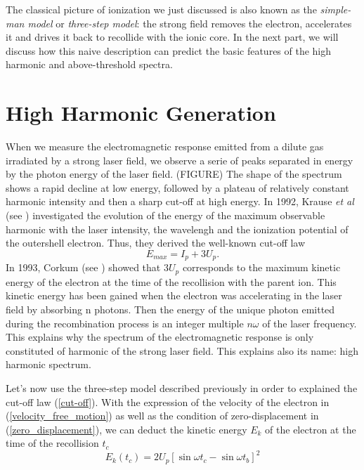 \documentclass[a4paper]{article}
\begin{document}
The classical picture of ionization we just discussed is also known as the \textit{simple-man model} or \textit{three-step model}:
the strong field removes the electron, accelerates it and drives it back to recollide with the ionic core.
In the next part, we will discuss how this naive description can predict the basic features of the high harmonic and above-threshold spectra.

\section{High Harmonic Generation}

When we measure the electromagnetic response emitted from a dilute gas irradiated by a strong laser field, we observe a serie of peaks separated in energy by the photon energy of the laser field. (FIGURE) The shape of the spectrum shows a rapid decline at low energy, followed by a plateau of relatively constant harmonic intensity and then a sharp cut-off at high energy.
In 1992, Krause \textit{et al} (see \cite{Krause_1992}) investigated the evolution of the energy of the maximum observable harmonic with the laser intensity, the wavelengh and the ionization potential of the outershell electron. Thus, they derived the well-known cut-off law
\begin{equation}
\label{cut-off}
E_{max}=I_{p}+3U_{p}.
\end{equation}
In 1993, Corkum (see \cite{Corkum_1993}) showed that $3U_{p}$ corresponds to the maximum kinetic energy of the electron at the time of the recollision with the parent ion. This kinetic energy has been gained when the electron was accelerating in the laser field by absorbing n photons. Then the energy of the unique photon emitted during the recombination process is an integer multiple $n\omega$ of the laser frequency. This explains why the spectrum of the electromagnetic response is only constituted of harmonic of the strong laser field. This explains also its name: high harmonic spectrum.
\par 
Let's now use the three-step model described previously in order to explained the cut-off law (\ref{cut-off}).
With the expression of the velocity of the electron in (\ref{velocity_free_motion}) as well as the condition of zero-displacement in (\ref{zero_displacement}), we can deduct the kinetic energy $E_{k}$ of the electron at the time of the recollision $t_{c}$
\begin{equation}
E_{k}(t_{c})=2U_{p}\left[ \sin{\omega t_{c}}-\sin{\omega t_{b}}\right ]^{2}
\end{equation}
\end{document}
